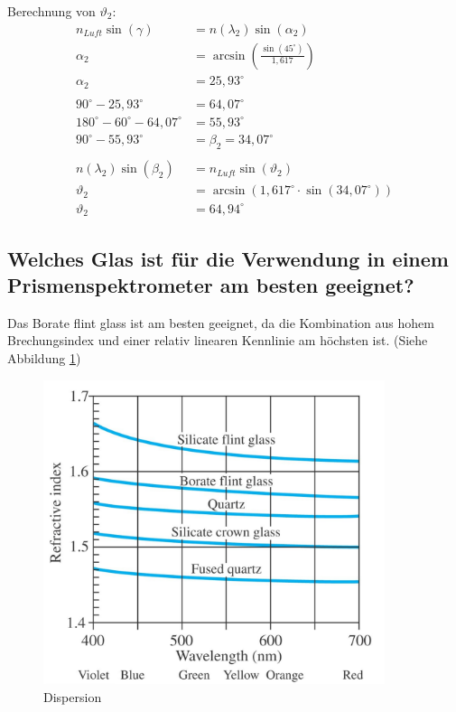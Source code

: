 \documentclass[a4paper]{scrartcl}
\numberwithin{equation}{subsection}
\begin{document}
Berechnung von $\vartheta_2$:
\begin{align*}
	n_{Luft}\sin(\gamma) &= n(\lambda_2)\sin(\alpha_2) \\
	\alpha_2 &= \arcsin\left(\frac{\sin(45^\circ)}{1,617}\right) \\
	\alpha_2 &= 25,93^\circ \\
	\quad \\
	90^\circ - 25,93^\circ &= 64,07^\circ \\
	180^\circ - 60^\circ - 64,07^\circ &= 55,93^\circ \\
	90^\circ - 55,93^\circ &= \beta_2 = 34,07^\circ \\
	\quad \\
	n(\lambda_2)\sin(\beta_2) &= n_{Luft}\sin(\vartheta_2) \\
	\vartheta_2 &= \arcsin(1,617^\circ \cdot \sin(34,07^\circ)) \\
	\vartheta_2 &= 64,94^\circ
\end{align*}
\newpage
\subsection{Welches Glas ist für die Verwendung in einem Prismenspektrometer am besten geeignet?}
Das Borate flint glass ist am besten geeignet, da die Kombination aus hohem Brechungsindex und einer relativ linearen Kennlinie am höchsten ist.
(Siehe Abbildung \ref{fig:Dispersion})

\begin{figure}[H]
	\includegraphics[width=10cm]{Abbildungen/Dispersion}
	\centering
	\caption{Dispersion \cite{anl}}
	\centering
	\label{fig:Dispersion}
\end{figure}
\end{document}

